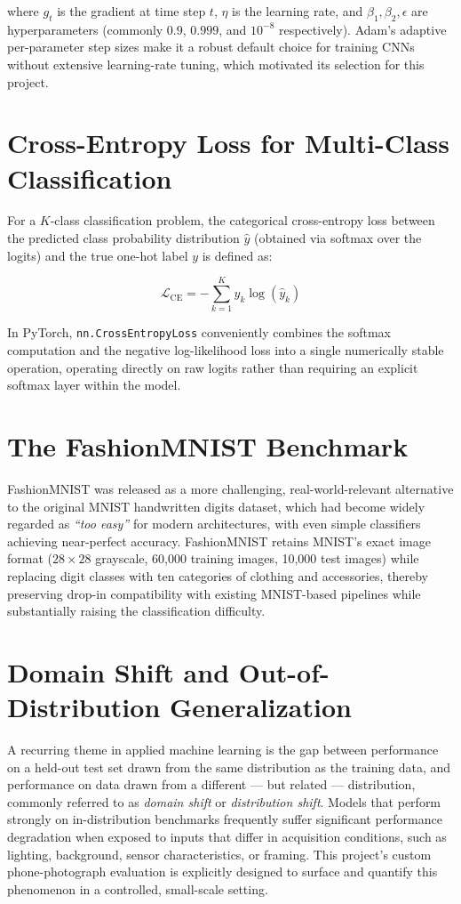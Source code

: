 \documentclass[12pt,a4paper]{report}
\begin{document}
where $g_t$ is the gradient at time step $t$, $\eta$ is the learning rate, and $\beta_1, \beta_2, \epsilon$ are hyperparameters (commonly $0.9$, $0.999$, and $10^{-8}$ respectively). Adam's adaptive per-parameter step sizes make it a robust default choice for training CNNs without extensive learning-rate tuning, which motivated its selection for this project.

\section{Cross-Entropy Loss for Multi-Class Classification}
For a $K$-class classification problem, the categorical cross-entropy loss between the predicted class probability distribution $\hat{y}$ (obtained via softmax over the logits) and the true one-hot label $y$ is defined as:

\begin{equation}
    \mathcal{L}_{\text{CE}} = -\sum_{k=1}^{K} y_k \log(\hat{y}_k)
\end{equation}

In PyTorch, \texttt{nn.CrossEntropyLoss} conveniently combines the softmax computation and the negative log-likelihood loss into a single numerically stable operation, operating directly on raw logits rather than requiring an explicit softmax layer within the model.

\section{The FashionMNIST Benchmark}
FashionMNIST was released as a more challenging, real-world-relevant alternative to the original MNIST handwritten digits dataset, which had become widely regarded as \emph{``too easy''} for modern architectures, with even simple classifiers achieving near-perfect accuracy. FashionMNIST retains MNIST's exact image format ($28\times28$ grayscale, 60,000 training images, 10,000 test images) while replacing digit classes with ten categories of clothing and accessories, thereby preserving drop-in compatibility with existing MNIST-based pipelines while substantially raising the classification difficulty.

\section{Domain Shift and Out-of-Distribution Generalization}
A recurring theme in applied machine learning is the gap between performance on a held-out test set drawn from the same distribution as the training data, and performance on data drawn from a different — but related — distribution, commonly referred to as \emph{domain shift} or \emph{distribution shift}. Models that perform strongly on in-distribution benchmarks frequently suffer significant performance degradation when exposed to inputs that differ in acquisition conditions, such as lighting, background, sensor characteristics, or framing. This project's custom phone-photograph evaluation is explicitly designed to surface and quantify this phenomenon in a controlled, small-scale setting.
\end{document}
